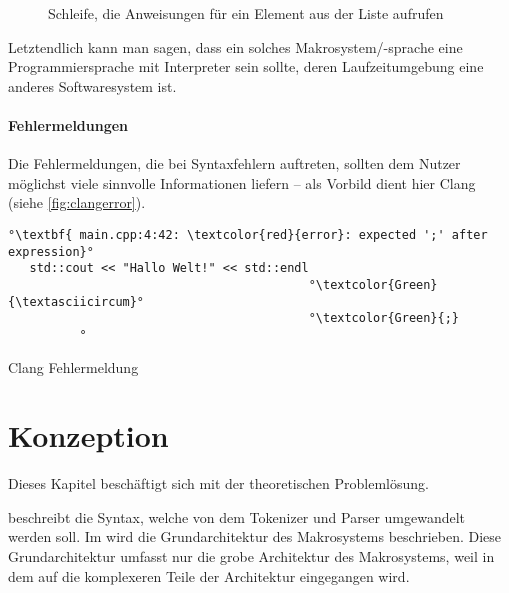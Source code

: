     \begin{figure}[H]
      \centering
      \caption{Schleife, die Anweisungen für ein Element aus der Liste aufrufen}
      \label{fig:loop}
    \end{figure}

    Letztendlich kann man sagen, dass ein solches Makrosystem/-sprache eine Programmiersprache mit Interpreter \autocite[S.274]{Gamma:1995:DPE:186897} sein sollte, deren Laufzeitumgebung eine anderes Softwaresystem ist.

    \paragraph{Fehlermeldungen}
      Die Fehlermeldungen, die bei Syntaxfehlern auftreten, sollten dem Nutzer möglichst viele sinnvolle Informationen liefern -- als Vorbild dient hier Clang (siehe \autoref{fig:clangerror}).

      \begin{myCodeEnv}
        \centering
        \begin{myInvBox}[width=.9\linewidth]
          \begin{lstlisting}[keepspaces,escapechar=°,numbers=none]
°\textbf{ main.cpp:4:42: \textcolor{red}{error}: expected ';' after expression}°
   std::cout << "Hallo Welt!" << std::endl
                                          °\textcolor{Green}{\textasciicircum}°
                                          °\textcolor{Green}{;}
          °\end{lstlisting}
        \end{myInvBox}
        \caption{Clang Fehlermeldung}
        \label{fig:clangerror}
      \end{myCodeEnv}

\section{Konzeption}
\label{sec:Konzeption}
  Dieses Kapitel beschäftigt sich mit der theoretischen Problemlösung.

   beschreibt die Syntax, welche von dem Tokenizer und Parser umgewandelt werden soll. Im  wird die Grundarchitektur des Makrosystems beschrieben. Diese Grundarchitektur umfasst nur die grobe Architektur des Makrosystems, weil in dem  auf die komplexeren Teile der Architektur eingegangen wird.

